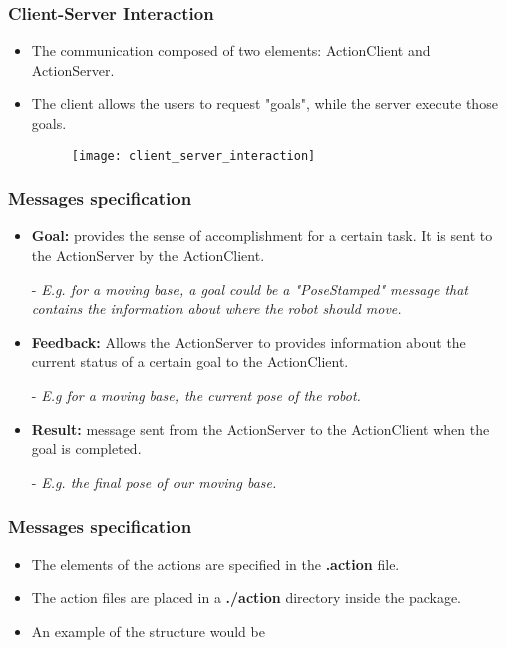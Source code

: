 \documentclass{beamer}
\begin{document}
	\begin{frame}
		\frametitle{Client-Server Interaction}
		\begin{itemize}
			\item{The communication composed of two elements: ActionClient and ActionServer.}
			\item{The client allows the users to request "goals", while the server execute those goals.}
			\begin{figure}[h!]
				\texttt{[image: client\_server\_interaction]}
			\end{figure}
			
		\end{itemize}
	\end{frame}
	
	\begin{frame}
		\frametitle{Messages specification}
		\begin{itemize}
			\item{\textbf{Goal: } provides the sense of accomplishment for a certain task. It is sent to the ActionServer by the ActionClient.}
			\item[-]{ \textit{E.g. for a moving base, a goal could be a "PoseStamped" message that contains the information about where the robot should move.}}
			\item{\textbf{Feedback: } Allows the ActionServer to provides information about the current status of a certain goal to the ActionClient.}
			\item[-]{\textit{E.g for a moving base, the current pose of the robot.}}
			\item{\textbf{Result: } message sent from the ActionServer to the ActionClient when the goal is completed.}
			\item[-]{\textit{E.g. the final pose of our moving base.}}
		\end{itemize}
	\end{frame}
	\begin{frame}
		\frametitle{Messages specification}
		\begin{itemize}
			\item{The elements of the actions are specified in the \textbf{.action} file.}
			\item{The action files are placed in a \textbf{./action} directory inside the package.}
			\item{An example of the structure would be}
			\sleepSort
		\end{itemize}
	\end{frame}
	
\end{document}
